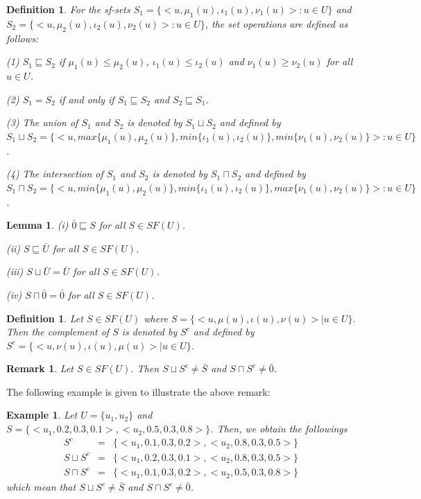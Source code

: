 \documentclass{IJFS}
\newtheorem{lemma}[theorem]{Lemma}
\newtheorem{definition}[theorem]{Definition}
\newtheorem{ex}[theorem]{Example}
\newtheorem{remark}[theorem]{Remark}
\begin{document}
\begin{definition}\cite{as00} For the sf-sets $S_1=\{<u,\mu_1(u), \iota_1(u),\nu_1(u)>:u\in U\}$ and  $S_2=\{<u, \mu_2(u), \iota_2(u), \nu_2(u)>:u\in U\}$, the set operations are
defined as follows:

(1) $S_1 \sqsubseteq S_2$ if $\mu_1(u)\le \mu_2(u)$,
$\iota_1(u)\le \iota_2(u)$ and $\nu_1(u)\ge \nu_2(u)$ for all
$u\in U$.

(2) $S_1=S_2$ if and only if $S_1\sqsubseteq S_2$ and $S_2
\sqsubseteq S_1$.

(3) The union of $S_1$ and $S_2$ is denoted by $S_1 \sqcup S_2$ and defined by \linebreak[4] $S_1 \sqcup S_2=\{<u,max\{\mu_1(u),\mu_2(u)\}, min\{\iota_1(u), \iota_2(u)\}, min\{\nu_1(u), \nu_2(u)\}>:u\in
U\}$.

(4) The intersection of $S_1$ and $S_2$ is denoted by $S_1 \sqcap
S_2$ and defined by \linebreak[4] $S_1 \sqcap S_2=\{<u,min\{\mu_1(u),\mu_2(u)\},
min\{\iota_1(u), \iota_2(u)\}, max\{\nu_1(u), \nu_2(u)\}>:u\in
U\}$.
\end{definition}

\begin{lemma} (i) $\bar{0} \sqsubseteq S$ for all $S\in SF(U)$.

(ii) $ S \sqsubseteq \bar{U}$ for all $S\in SF(U)$.

(iii) $S \sqcup \bar{U}=\bar{U}$ for all $S\in SF(U)$.

(iv) $S \sqcap \bar{0}=\bar{0}$ for all $S\in SF(U)$.

\end{lemma}

\begin{definition} \cite{as0} Let $S\in SF(U)$ where $S=\{<u, \mu(u), \iota(u), \nu(u)>|u\in U\}$. Then  the complement of $S$ is denoted by $S^c$ and defined
by $S^c=\{<u, \nu(u), \iota(u), \mu(u)>|u\in U\}$. \end{definition}

\begin{remark} Let $S\in SF(U)$. Then $S {\sqcup}S^c\ne \bar{S}$
and $S{\sqcap}S^c\ne \bar{0}$.\end{remark}

The following example is given to illustrate the above remark:
\begin{ex} Let $U=\{u_1, u_2\}$ and $S=\{<u_1, 0.2, 0.3,
0.1>,<u_2, 0.5, 0.3, 0.8>\}$. Then, we obtain the followings 
\begin{eqnarray*}
S^c&=&\{<u_1,
0.1, 0.3, 0.2>, <u_2, 0.8, 0.3, 0.5>\}\\
S{\sqcup}S^c &=&\{<u_1, 0.2, 0.3, 0.1>, <u_2, 0.8, 0.3, 0.5>\}\\
S{\sqcap}S^c &=&\{<u_1, 0.1, 0.3, 0.2>, <u_2, 0.5, 0.3, 0.8>\}
\end{eqnarray*}
which mean that $S{\sqcup}S^c\ne \bar{S}$ and $S{\sqcap}S^c\ne
\bar{0}$.
\end{ex}
\end{document}
